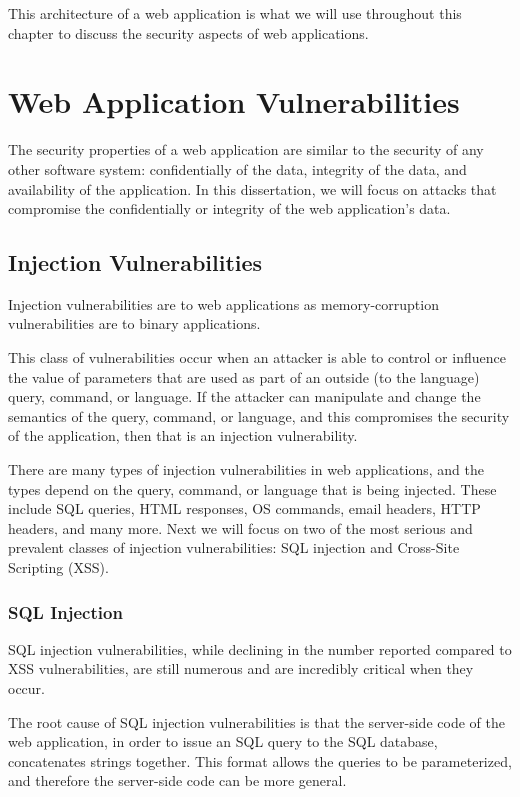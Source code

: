 This architecture of a web application is what we will use throughout
this chapter to discuss the security aspects of web applications.

\section{Web Application Vulnerabilities}

The security properties of a web application are similar to the
security of any other software system: confidentially of the data,
integrity of the data, and availability of the application. In this
dissertation, we will focus on attacks that compromise the
confidentially or integrity of the web application's data.

\subsection{Injection Vulnerabilities}

Injection vulnerabilities are to web applications as memory-corruption
vulnerabilities are to binary applications. 

This class of vulnerabilities occur when an attacker is able to
control or influence the value of parameters that are used as part of
an outside (to the language) query, command, or language. If the
attacker can manipulate and change the semantics of the query,
command, or language, and this compromises the security of the
application, then that is an injection vulnerability.

There are many types of injection vulnerabilities in web applications,
and the types depend on the query, command, or language that is being
injected. These include SQL queries, HTML responses, OS commands,
email headers, HTTP headers, and many more. Next we will focus on two
of the most serious and prevalent classes of injection
vulnerabilities: SQL injection and Cross-Site Scripting (XSS).

\subsubsection{SQL Injection}

SQL injection vulnerabilities, while declining in the number reported
compared to XSS vulnerabilities, are still numerous and are incredibly
critical when they occur.

The root cause of SQL injection vulnerabilities is that the
server-side code of the web application, in order to issue an SQL
query to the SQL database, concatenates strings together. This format
allows the queries to be parameterized, and therefore the server-side
code can be more general. 

